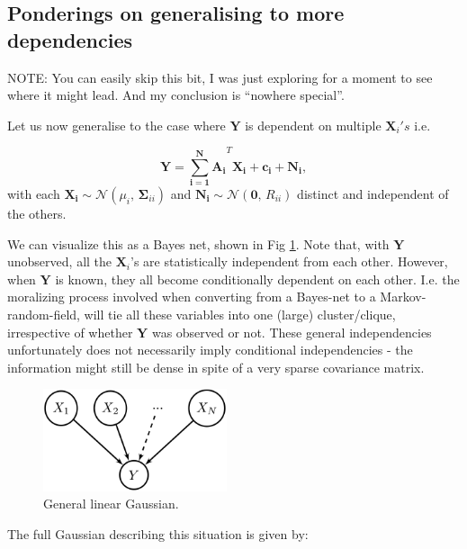 \subsection{Ponderings on generalising to more dependencies }

NOTE: You can easily skip this bit, I was just exploring for a moment
to see where it might lead. And my conclusion is ``nowhere special''.

Let us now generalise to the case where $\mathbf{Y}$ is dependent
on multiple $\mathbf{X}_{i}'s$ i.e.

\[
\mathbf{Y}=\mathbf{\sum_{i=1}^{N}A_{i}}^{T}\mathbf{X_{i}}+\mathbf{c_{i}}+\mathbf{N_{i}},
\]
with each $\mathbf{X_{i}}\sim\mathcal{N}(\mu_{i},\mathbf{\,\Sigma}_{ii})$
and $\mathbf{N_{i}}\sim\mathcal{N}(\mathbf{0},\, R_{ii})$ distinct
and independent of the others.

We can visualize this as a Bayes net, shown in Fig \ref{fig:lingauss_bn}.
Note that, with $\mathbf{Y}$ unobserved, all the $\mathbf{X}_{i}$'s
are statistically independent from each other. However, when $\mathbf{Y}$
is known, they all become conditionally dependent on each other. I.e.
the moralizing process involved when converting from a Bayes-net to
a Markov-random-field, will tie all these variables into one (large)
cluster/clique, irrespective of whether $\mathbf{Y}$ was observed
or not. These general independencies unfortunately does not necessarily
imply conditional independencies - the information might still be
dense in spite of a very sparse covariance matrix.

\begin{figure}
\noindent \begin{centering}
\includegraphics[height=3cm]{lingauss_bn}
\par\end{centering}

\caption{General linear Gaussian.}
\label{fig:lingauss_bn}
\end{figure}


The full Gaussian describing this situation is given by:

